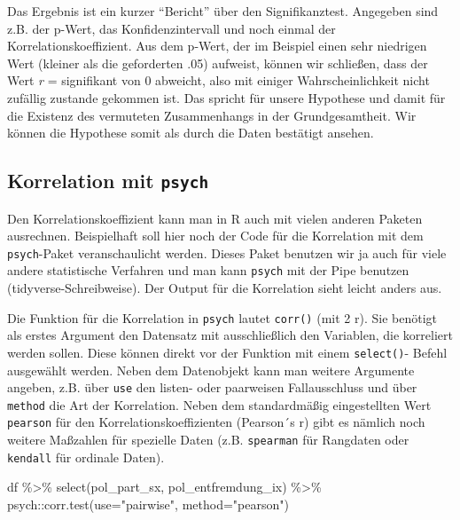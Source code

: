 \documentclass[
]{book}
\newenvironment{Shaded}{\begin{snugshade}}{\end{snugshade}}
\newcommand{\AttributeTok}[1]{\textcolor[rgb]{0.77,0.63,0.00}{#1}}
\newcommand{\FunctionTok}[1]{\textcolor[rgb]{0.00,0.00,0.00}{#1}}
\newcommand{\NormalTok}[1]{#1}
\newcommand{\SpecialCharTok}[1]{\textcolor[rgb]{0.00,0.00,0.00}{#1}}
\newcommand{\StringTok}[1]{\textcolor[rgb]{0.31,0.60,0.02}{#1}}
\begin{document}
Das Ergebnis ist ein kurzer ``Bericht'' über den Signifikanztest. Angegeben sind z.B. der p-Wert, das Konfidenzintervall und noch einmal der Korrelationskoeffizient. Aus dem p-Wert, der im Beispiel einen sehr niedrigen Wert (kleiner als die geforderten .05) aufweist, können wir schließen, dass der Wert \emph{r} =  signifikant von 0 abweicht, also mit einiger Wahrscheinlichkeit nicht zufällig zustande gekommen ist. Das spricht für unsere Hypothese und damit für die Existenz des vermuteten Zusammenhangs in der Grundgesamtheit. Wir können die Hypothese somit als durch die Daten bestätigt ansehen.

\hypertarget{korrelation-mit-psych}{%
\subsection{\texorpdfstring{Korrelation mit \texttt{psych}}{Korrelation mit psych}}\label{korrelation-mit-psych}}

Den Korrelationskoeffizient kann man in R auch mit vielen anderen Paketen ausrechnen. Beispielhaft soll hier noch der Code für die Korrelation mit dem \texttt{psych}-Paket veranschaulicht werden. Dieses Paket benutzen wir ja auch für viele andere statistische Verfahren und man kann \texttt{psych} mit der Pipe benutzen (tidyverse-Schreibweise). Der Output für die Korrelation sieht leicht anders aus.

Die Funktion für die Korrelation in \texttt{psych} lautet \texttt{corr()} (mit 2 r). Sie benötigt als erstes Argument den Datensatz mit ausschließlich den Variablen, die korreliert werden sollen. Diese können direkt vor der Funktion mit einem \texttt{select()}- Befehl ausgewählt werden. Neben dem Datenobjekt kann man weitere Argumente angeben, z.B. über \texttt{use} den listen- oder paarweisen Fallausschluss und über \texttt{method} die Art der Korrelation. Neben dem standardmäßig eingestellten Wert \texttt{pearson} für den Korrelationskoeffizienten (Pearson´s r) gibt es nämlich noch weitere Maßzahlen für spezielle Daten (z.B. \texttt{spearman} für Rangdaten oder \texttt{kendall} für ordinale Daten).

\begin{Shaded}
\begin{Highlighting}[]
\NormalTok{df }\SpecialCharTok{\%\textgreater{}\%}
  \FunctionTok{select}\NormalTok{(pol\_part\_sx, pol\_entfremdung\_ix) }\SpecialCharTok{\%\textgreater{}\%} 
\NormalTok{  psych}\SpecialCharTok{::}\FunctionTok{corr.test}\NormalTok{(}\AttributeTok{use=}\StringTok{"pairwise"}\NormalTok{, }\AttributeTok{method=}\StringTok{"pearson"}\NormalTok{)}
\end{Highlighting}
\end{Shaded}
\end{document}

